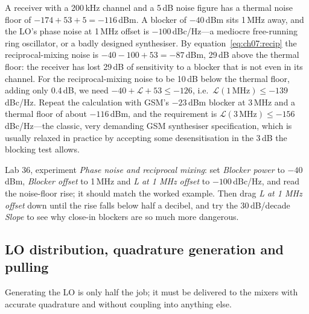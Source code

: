 \begin{worked}
A receiver with a 200\,kHz channel and a 5\,dB noise figure has a thermal noise floor of
$-174+53+5=-116$\,dBm. A blocker of $-40$\,dBm sits 1\,MHz away, and the LO's phase noise at 1\,MHz offset is
$-100$\,dBc/Hz---a mediocre free-running ring oscillator, or a badly designed synthesiser. By
equation~\eqref{eq:ch07:recip} the reciprocal-mixing noise is $-40-100+53=-87$\,dBm, 29\,dB above the
thermal floor: the receiver has lost 29\,dB of sensitivity to a blocker that is not even in its channel.
For the reciprocal-mixing noise to be 10\,dB below the thermal floor, adding only 0.4\,dB, we need
$-40+\mathcal L+53\le-126$, i.e.\ $\mathcal L(1\,\text{MHz})\le-139$\,dBc/Hz. Repeat the calculation with
GSM's $-23$\,dBm blocker at 3\,MHz and a thermal floor of about $-116$\,dBm, and the requirement is
$\mathcal L(3\,\text{MHz})\le-156$\,dBc/Hz---the classic, very demanding GSM synthesiser specification,
which is usually relaxed in practice by accepting some desensitisation in the 3\,dB the blocking test
allows.
\end{worked}

\begin{tryit}
Lab 36, experiment \emph{Phase noise and reciprocal mixing}: set \emph{Blocker power} to $-40$\,dBm,
\emph{Blocker offset} to 1\,MHz and \emph{L at 1 MHz offset} to $-100$\,dBc/Hz, and read the
noise-floor rise; it should match the worked example. Then drag \emph{L at 1 MHz offset} down until the
rise falls below half a decibel, and try the 30\,dB/decade \emph{Slope} to see why close-in blockers are
so much more dangerous.
\end{tryit}

\subsection{LO distribution, quadrature generation and pulling}

Generating the LO is only half the job; it must be delivered to the mixers with accurate quadrature and
without coupling into anything else.


